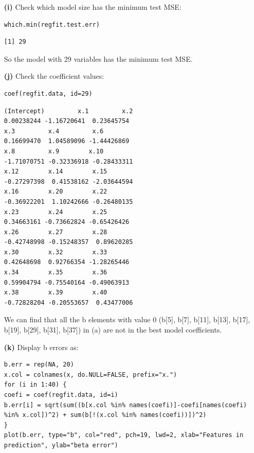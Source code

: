 \documentclass[twoside,11pt]{homework}
\begin{document}
\begin{enumerate}
\item[\textbf{(i)}] Check which model size has the minimum test MSE:

\begin{lstlisting}
which.min(regfit.test.err)
\end{lstlisting}

\begin{verbatim}
[1] 29

\end{verbatim}

So the model with 29 variables has the minimum test MSE.

\item[\textbf{(j)}] Check the coefficient values:

\begin{lstlisting}
coef(regfit.data, id=29)
\end{lstlisting}

\begin{verbatim}
(Intercept)         x.1         x.2 
0.00238244 -1.16720641  0.23645754 
x.3         x.4         x.6 
0.16699470  1.04589096 -1.44426869 
x.8         x.9        x.10 
-1.71070751 -0.32336918 -0.28433311 
x.12        x.14        x.15 
-0.27297398  0.41538162 -2.03644594 
x.16        x.20        x.22 
-0.36922201  1.10242666 -0.26480135 
x.23        x.24        x.25 
0.34663161 -0.73662824 -0.65426426 
x.26        x.27        x.28 
-0.42748998 -0.15248357  0.89620285 
x.30        x.32        x.33 
0.42648698  0.92766354 -1.28265446 
x.34        x.35        x.36 
0.59904794 -0.75540164 -0.49063913 
x.38        x.39        x.40 
-0.72828204 -0.20553657  0.43477006

\end{verbatim}

We can find that all the b elements with value $0$ (b[5], b[7], b[11], b[13], b[17], b[19], b[29], b[31], b[37]) in (a) are not in the best model coefficients.

\item[\textbf{(k)}] Display b errors as:

\begin{lstlisting}
b.err = rep(NA, 20)
x.col = colnames(x, do.NULL=FALSE, prefix="x.")
for (i in 1:40) {
coefi = coef(regfit.data, id=i)
b.err[i] = sqrt(sum((b[x.col %in% names(coefi)]-coefi[names(coefi) %in% x.col])^2) + sum(b[!(x.col %in% names(coefi))])^2)
}
plot(b.err, type="b", col="red", pch=19, lwd=2, xlab="Features in prediction", ylab="beta error")
\end{lstlisting}


\end{enumerate}
\end{document}
